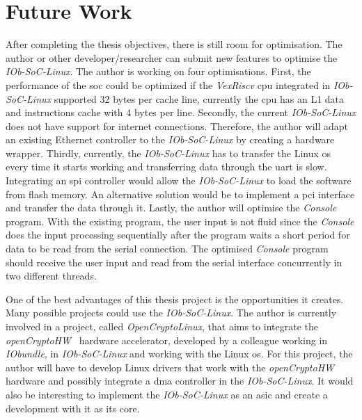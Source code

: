 \section{Future Work}
\label{section:future}
After completing the thesis objectives, there is still room for optimisation. The author or other developer/researcher can submit new features to optimise the \textit{IOb-SoC-Linux}. The author is working on four optimisations. First, the performance of the \acrshort{soc} could be optimized if the \textit{VexRiscv} \acrshort{cpu} integrated in \textit{IOb-SoC-Linux} supported 32 bytes per cache line, currently the \acrshort{cpu} has an L1 data and instructions cache with 4 bytes per line. Secondly, the current \textit{IOb-SoC-Linux} does not have support for internet connections. Therefore, the author will adapt an existing Ethernet controller to the \textit{IOb-SoC-Linux} by creating a hardware wrapper. Thirdly, currently, the \textit{IOb-SoC-Linux} has to transfer the Linux \acrshort{os} every time it starts working and transferring data through the \acrshort{uart} is slow. Integrating an \acrfull{spi} controller would allow the \textit{IOb-SoC-Linux} to load the software from flash memory. An alternative solution would be to implement a \acrshort{pci} interface and transfer the data through it. Lastly, the author will optimise the \textit{Console} program. With the existing program, the user input is not fluid since the \textit{Console} does the input processing sequentially after the program waits a short period for data to be read from the serial connection. The optimised \textit{Console} program should receive the user input and read from the serial interface concurrently in two different threads.

One of the best advantages of this thesis project is the opportunities it creates. Many possible projects could use the \textit{IOb-SoC-Linux}. The author is currently involved in a project, called \textit{OpenCryptoLinux}, that aims to integrate the \textit{openCryptoHW}~\cite{open_crypto_hw} hardware accelerator, developed by a colleague working in \textit{IObundle}, in \textit{IOb-SoC-Linux} and working with the Linux \acrshort{os}. For this project, the author will have to develop Linux drivers that work with the \textit{openCryptoHW} hardware and possibly integrate a \acrshort{dma} controller in the \textit{IOb-SoC-Linux}. It would also be interesting to implement the \textit{IOb-SoC-Linux} as an \acrshort{asic} and create a development with it as its core.
